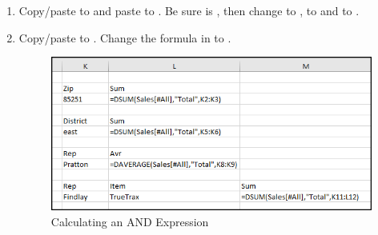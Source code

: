 \begin{enumbox}
	\begin{enumerate}
		\item Copy/paste  to  and paste  to . Be sure  is , then change  to ,  to  and  to .
		\item Copy/paste  to . Change the formula in  to . 
		
		\begin{figure}[H]
			\centering
			\includegraphics[width=\maxwidth{.95\linewidth}]{gfx/ch09_fig22}
			\caption{Calculating an AND Expression}
			\label{09:fig22}
		\end{figure}
		

\end{enumerate}
\end{enumbox}
